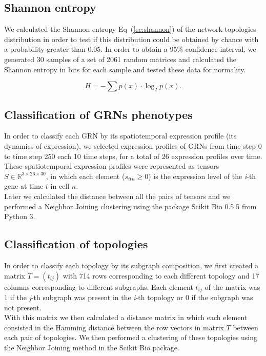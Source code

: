 \documentclass[10pt,letterpaper]{article}
\begin{document}
\subsection*{Shannon entropy}

We calculated the Shannon entropy Eq~(\ref{ec:shannon}) of the network 
topologies distribution in order to test if this distribution could be obtained 
by chance with a probability greater than 0.05. In order to obtain a 95\% 
confidence interval, we generated 30 samples of a set of 2061 random matrices 
and calculated the Shannon entropy in bits for each sample and tested these data
for normality.

\begin{equation}
 H = -\sum p(x) \cdot \log_{2}p(x).
 \label{ec:shannon}
\end{equation}

\subsection*{Classification of GRNs phenotypes}

In order to classify each GRN by its spatiotemporal expression profile (its 
dynamics of expression), we selected expression profiles of GRNs from time step 
0 to time step 250 each 10 time steps, for a total of 26 expression profiles 
over time. These spatiotemporal expression profiles were represented as tensors 
$S \in \mathbb{R}^{3 \times 26 \times 30}$, in which each element ($s_{itn} \geq
0$) is the expression level of the \emph{i}-th gene at time $t$ in cell $n$.\\

Later we calculated the distance between all the pairs of tensors and we 
performed a Neighbor Joining clustering using the package Scikit Bio 0.5.5 from 
Python 3.

\subsection*{Classification of topologies}

In order to classify each topology by its subgraph composition, we first created
a matrix  $T = (t_{ij})$ with 714 rows corresponding to each different topology 
and 17 columns corresponding to different subgraphs. Each element $t_{ij}$ of 
the matrix was 1 if the \emph{j}-th subgraph was present in the \emph{i}-th 
topology or 0 if the subgraph was not present.\\

With this matrix we then calculated a distance matrix in which each element 
consisted in the Hamming distance between the row vectors in matrix $T$ between 
each pair of topologies. We then performed a clustering of these topologies 
using the Neighbor Joining method in the Scikit Bio package.
\end{document}
